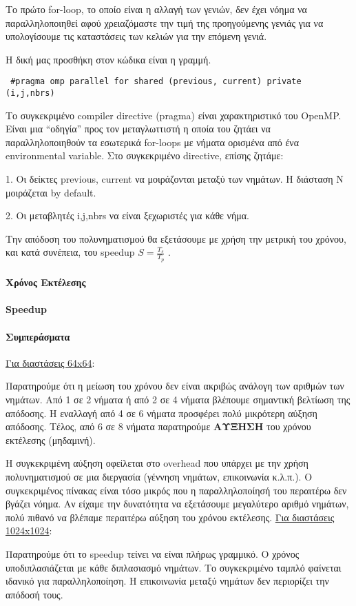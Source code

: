 \documentclass[letterpaper,12pt]{article}
\begin{document}
Το πρώτο for-loop, το οποίο είναι η αλλαγή των γενιών, δεν έχει νόημα να παραλληλοποιηθεί αφού χρειαζόμαστε την τιμή της προηγούμενης γενιάς για να υπολογίσουμε τις καταστάσεις των κελιών για την επόμενη γενιά. \newline

Η δική μας προσθήκη στον κώδικα είναι η γραμμή.

\begin{lstlisting}
 #pragma omp parallel for shared (previous, current) private (i,j,nbrs)
\end{lstlisting}


Το συγκεκριμένο compiler directive (pragma) είναι χαρακτηριστικό του OpenMP. Είναι μια “οδηγία” προς τον μεταγλωττιστή η οποία του ζητάει να παραλληλοποιηθούν τα εσωτερικά for-loops με νήματα ορισμένα από ένα environmental variable. Στο συγκεκριμένο directive, επίσης ζητάμε:

1.	Οι δείκτες previous, current να μοιράζονται μεταξύ των νημάτων. Η διάσταση Ν μοιράζεται by default.

2.	Οι μεταβλητές i,j,nbrs να είναι ξεχωριστές για κάθε νήμα.
\newline

Την απόδοση του πολυνηματισμού θα εξετάσουμε με χρήση την μετρική του χρόνου, και κατά συνέπεια, του speedup $S=\frac{T_s}{T_p}$ . \newline


\paragraph{Χρόνος Εκτέλεσης}
\paragraph{Speedup}

\paragraph{Συμπεράσματα} \hfill \break
\underline{Για διαστάσεις 64x64}:

Παρατηρούμε ότι η μείωση του χρόνου δεν είναι ακριβώς ανάλογη των αριθμών των νημάτων. Από 1 σε 2 νήματα ή από 2 σε 4 νήματα βλέπουμε σημαντική βελτίωση της απόδοσης. Η εναλλαγή από 4 σε 6 νήματα προσφέρει πολύ μικρότερη αύξηση απόδοσης. Τέλος, από 6 σε 8 νήματα παρατηρούμε \textbf{ΑΥΞΗΣΗ} του χρόνου εκτέλεσης (μηδαμινή). 

Η συγκεκριμένη αύξηση οφείλεται στο overhead που υπάρχει με την χρήση πολυνηματισμού σε μια διεργασία (γέννηση νημάτων, επικοινωνία κ.λ.π.). Ο συγκεκριμένος πίνακας είναι τόσο μικρός που η παραλληλοποίησή του περαιτέρω δεν βγάζει νόημα. Αν είχαμε την δυνατότητα να εξετάσουμε μεγαλύτερο αριθμό νημάτων, πολύ πιθανό να βλέπαμε περαιτέρω αύξηση του χρόνου εκτέλεσης.\newline
\underline{Για διαστάσεις 1024x1024}:

Παρατηρούμε ότι το speedup τείνει να είναι πλήρως γραμμικό. Ο χρόνος υποδιπλασιάζεται με κάθε διπλασιασμό νημάτων. Το συγκεκριμένο ταμπλό φαίνεται ιδανικό για παραλληλοποίηση. Η επικοινωνία μεταξύ νημάτων δεν περιορίζει την απόδοσή τους.
\end{document}
